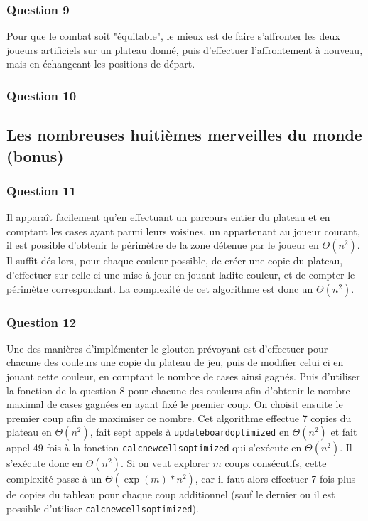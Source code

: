 \documentclass[12pt,a4paper,twoside]{article}
\begin{document}
\subsubsection*{Question 9}
\label{sec:orgheadline17}
Pour que le combat soit "équitable", le mieux est de faire s'affronter
les deux joueurs artificiels sur un plateau donné, puis d'effectuer
l'affrontement à nouveau, mais en échangeant les positions de départ.
\subsubsection*{Question 10}
\label{sec:orgheadline18}
\subsection{Les nombreuses huitièmes merveilles du monde (bonus)}
\label{sec:orgheadline22}
\subsubsection*{Question 11}
\label{sec:orgheadline20}
Il apparaît facilement qu'en effectuant un parcours entier du plateau
et en comptant les cases ayant parmi leurs voisines, un appartenant au
joueur courant, il est possible d'obtenir le périmètre de la zone
détenue par le joueur en \(\Theta(n^{2})\). Il suffit dés lors, pour chaque
couleur possible, de créer une copie du plateau, d'effectuer sur celle
ci une mise à jour en jouant ladite couleur, et de compter le
périmètre correspondant.
La complexité de cet algorithme est donc un \(\Theta(n^{2})\).
\subsubsection*{Question 12}
\label{sec:orgheadline21}
Une des manières d'implémenter le glouton prévoyant est d'effectuer
pour chacune des couleurs une copie du plateau de jeu, puis de
modifier celui ci en jouant cette couleur, en comptant le nombre de
cases ainsi gagnés. Puis d'utiliser la fonction de la question 8 pour
chacune des couleurs afin d'obtenir le nombre maximal de cases gagnées
en ayant fixé le premier coup. On choisit ensuite le premier coup afin
de maximiser ce nombre.  Cet algorithme effectue 7 copies du plateau
en \(\Theta(n^{2})\), fait sept appels à \texttt{updateboardoptimized} en
\(\Theta(n^{2})\) et fait appel 49 fois à la fonction
\texttt{calcnewcellsoptimized} qui s'exécute en \(\Theta(n^{2})\). Il s'exécute
donc en \(\Theta(n^{2})\).
Si on veut explorer \(m\) coups consécutifs, cette complexité passe à un
\(\Theta(\exp(m)*n^{2})\), car il faut alors effectuer 7 fois plus de copies du
tableau pour chaque coup additionnel (sauf le dernier ou il est possible
d'utiliser \texttt{calcnewcellsoptimized}).
\end{document}
